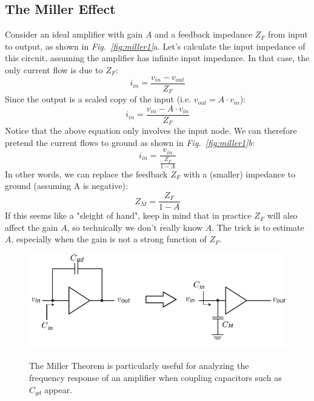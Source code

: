 \subsection{The Miller Effect}
Consider an ideal amplifier with gain $A$ and a feedback impedance $Z_F$ from input to output, as shown in \emph{Fig.~\ref{fig:miller1}}a.  Let's calculate the input impedance of this circuit, assuming the amplifier has infinite input impedance.  In that case, the only current flow is due to $Z_F$:
    \begin{equation}
        i_{in} = \frac{v_{in} - v_{out}}{Z_F}
    \end{equation}
Since the output is a scaled copy of the input (i.e. $v_{out} = A \cdot v_{in}$):
    \begin{equation}
        i_{in} = \frac{v_{in} - A \cdot v_{in}}{Z_F}
    \end{equation}
Notice that the above equation only involves the input node.  We can therefore pretend the current flows to ground as shown in \emph{Fig.~\ref{fig:miller1}b}:
    \begin{equation}
        i_{in} = \frac{v_{in}}{\frac{Z_F}{1 - A}}
    \end{equation}
In other words, we can replace the feedback $Z_F$ with a (smaller) impedance to ground (assuming A is negative):
    \begin{equation}
        Z_M = \frac{Z_F}{1 - A}
    \end{equation}
If this seems like a "sleight of hand", keep in mind that in practice $Z_F$ will also affect the gain $A$, so technically we don't really know $A$. The trick is to estimate $A$, especially when the gain is not a strong function of $Z_F$.
\begin{figure}[t]
\centering
\includegraphics[scale=1.05]{miller_cap}\\
\caption{The Miller Theorem is particularly useful for analyzing the frequency response of an amplifier when coupling capacitors such as $C_{gd}$ appear.}
\label{fig:miller2}
\end{figure}
